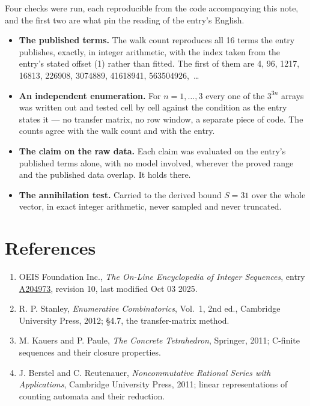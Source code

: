 \documentclass[11pt]{article}
\theoremstyle{definition}
\begin{document}
Four checks were run, each reproducible from the code accompanying this note, and the first two are what pin the reading of the entry's English.

\begin{itemize}

\item {\bfseries The published terms.} The walk count reproduces all 16 terms the entry publishes, exactly, in integer arithmetic, with the index taken from the entry's stated offset (1) rather than fitted. The first of them are 4, 96, 1217, 16813, 226908, 3074889, 41618941, 563504926,~\dots

\item {\bfseries An independent enumeration.} For $n = 1,\dots,3$ every one of the $3^{3n}$ arrays was written out and tested cell by cell against the condition as the entry states it --- no transfer matrix, no row window, a separate piece of code. The counts agree with the walk count and with the entry.

\item {\bfseries The claim on the raw data.} Each claim was evaluated on the entry's published terms alone, with no model involved, wherever the proved range and the published data overlap. It holds there.

\item {\bfseries The annihilation test.} Carried to the derived bound $S = 31$ over the whole vector, in exact integer arithmetic, never sampled and never truncated.

\end{itemize}

\section{References}

\begin{enumerate}

\item OEIS Foundation Inc., \emph{The On-Line Encyclopedia of Integer Sequences}, entry \href{https://oeis.org/A204973}{A204973}, revision 10, last modified Oct 03 2025.

\item R. P. Stanley, \emph{Enumerative Combinatorics}, Vol.~1, 2nd ed., Cambridge University Press, 2012; \S4.7, the transfer-matrix method.

\item M. Kauers and P. Paule, \emph{The Concrete Tetrahedron}, Springer, 2011; C-finite sequences and their closure properties.

\item J. Berstel and C. Reutenauer, \emph{Noncommutative Rational Series with Applications}, Cambridge University Press, 2011; linear representations of counting automata and their reduction.

\end{enumerate}
\end{document}
